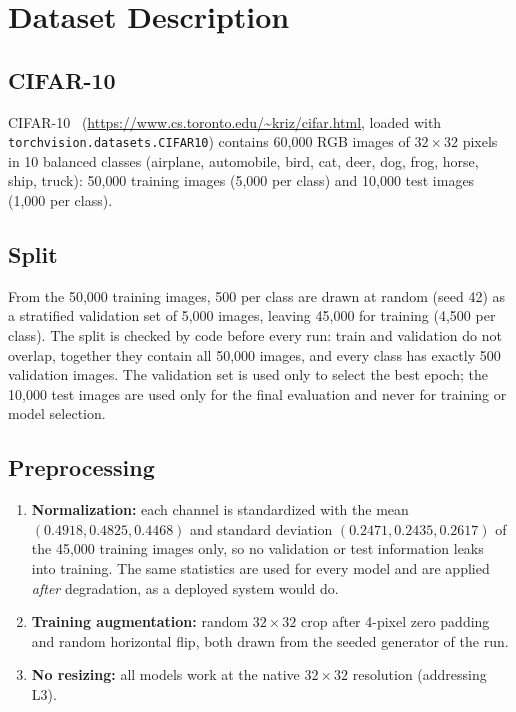 \documentclass[conference]{IEEEtran}
\begin{document}
\section{Dataset Description}

\subsection{CIFAR-10}
CIFAR-10~\cite{krizhevsky2009} (\url{https://www.cs.toronto.edu/~kriz/cifar.html}, loaded with \texttt{torchvision.datasets.CIFAR10}) contains 60{,}000 RGB images of $32\times32$ pixels in 10 balanced classes (airplane, automobile, bird, cat, deer, dog, frog, horse, ship, truck): 50{,}000 training images (5{,}000 per class) and 10{,}000 test images (1{,}000 per class).

\subsection{Split}
From the 50{,}000 training images, 500 per class are drawn at random (seed 42) as a stratified validation set of 5{,}000 images, leaving 45{,}000 for training (4{,}500 per class). The split is checked by code before every run: train and validation do not overlap, together they contain all 50{,}000 images, and every class has exactly 500 validation images. The validation set is used only to select the best epoch; the 10{,}000 test images are used only for the final evaluation and never for training or model selection.

\subsection{Preprocessing}
\begin{enumerate}
\item \textbf{Normalization:} each channel is standardized with the mean $(0.4918, 0.4825, 0.4468)$ and standard deviation $(0.2471, 0.2435, 0.2617)$ of the 45{,}000 training images only, so no validation or test information leaks into training. The same statistics are used for every model and are applied \emph{after} degradation, as a deployed system would do.
\item \textbf{Training augmentation:} random $32\times32$ crop after 4-pixel zero padding and random horizontal flip, both drawn from the seeded generator of the run.
\item \textbf{No resizing:} all models work at the native $32\times32$ resolution (addressing L3).
\end{enumerate}
\end{document}
